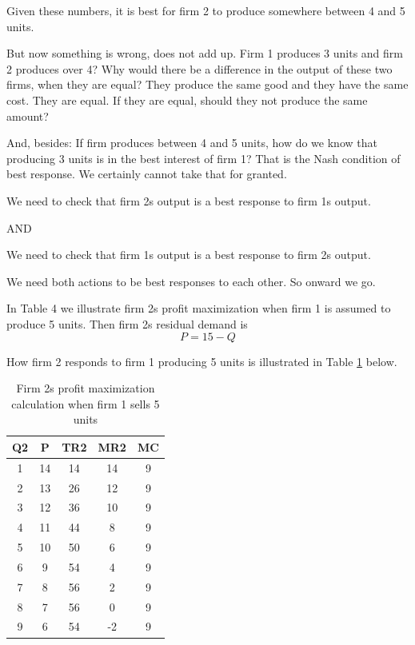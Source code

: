 \documentclass[
]{book}
\begin{document}
Given these numbers, it is best for firm 2 to produce somewhere between 4 and 5 units.

But now something is wrong, does not add up. Firm 1 produces 3 units and firm 2 produces over 4? Why would there be a difference in the output of these two firms, when they are equal? They produce the same good and they have the same cost. They are equal. If they are equal, should they not produce the same amount?

And, besides: If firm produces between 4 and 5 units, how do we know that producing 3 units is in the best interest of firm 1? That is the Nash condition of best response. We certainly cannot take that for granted.

\begin{center}
We need to check that firm 2s output is a best response to firm 1s output.

AND

We need to check that firm 1s output is a best response to firm 2s output.

\end{center}

We need both actions to be best responses to each other. So onward we go.

In Table 4 we illustrate firm 2s profit maximization when firm 1 is assumed to produce 5 units. Then firm 2s residual demand is
\[P  =  15  -  Q\]

How firm 2 responds to firm 1 producing 5 units is illustrated in Table \ref{tab:oligopoly04} below.

\begin{table}

\caption{\label{tab:oligopoly04}Firm 2s profit maximization calculation when firm 1 sells 5 units}
\centering
\begin{tabular}[t]{c|c|c|c|c}
\hline
Q2 & P & TR2 & MR2 & MC\\
\hline
1 & 14 & 14 & 14 & 9\\
\hline
2 & 13 & 26 & 12 & 9\\
\hline
3 & 12 & 36 & 10 & 9\\
\hline
4 & 11 & 44 & 8 & 9\\
\hline
5 & 10 & 50 & 6 & 9\\
\hline
6 & 9 & 54 & 4 & 9\\
\hline
7 & 8 & 56 & 2 & 9\\
\hline
8 & 7 & 56 & 0 & 9\\
\hline
9 & 6 & 54 & -2 & 9\\
\hline
\end{tabular}
\end{table}
\end{document}
